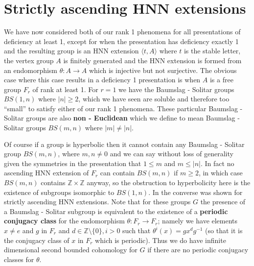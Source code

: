 \documentclass[11pt,reqno]{amsart}
\numberwithin{equation}{section}
\newcommand{\Z}{\mathbb{Z}}
\newcommand{\leqs}{\leqslant}
\newcommand{\geqs}{\geqslant}
\theoremstyle{definition}
\theoremstyle{remark}
\begin{document}
  

\section{Strictly ascending HNN extensions}

We have now considered both of our rank 1 phenomena for all presentations
of deficiency at least 1, except for when the presentation has deficiency
exactly 1 and the resulting group is an HNN extension $\langle t,A\rangle$
where $t$ is the stable letter, the vertex group $A$ is finitely
generated and the HNN extension is formed from an endomorphism
$\theta:A \rightarrow A$ which is injective but not surjective. The obvious
case where this case results in a deficiency 1 presentation is
when $A$ is a free group $F_r$ of rank at least 1. For $r=1$ we have
the Baumslag - Solitar groups $BS(1,n)$
where $|n|\geqs 2$, which we have seen are soluble and therefore too ``small''
to satisfy either of our rank 1 phenomena.
These particular
Baumslag - Solitar groups are also {\bf non - Euclidean} which we define
to mean Baumslag - Solitar groups $BS(m,n)$ where $|m|\neq |n|$.

Of course if a group is hyperbolic then it cannot contain any
Baumslag - Solitar
group $BS(m,n)$, where $m,n\neq 0$ and we can say without loss of generality
given the symmetries in the presentation that $1\leqs m$ and $m\leqs |n|$.
In fact no ascending HNN extension of $F_r$ can contain $BS(m,n)$
if $m\geqs 2$, in which case $BS(m,n)$ contains $\Z\times\Z$ anyway, 
so the obstruction to hyperbolicity here is the existence of subgroups
isomorphic to $BS(1,n)$.
In \cite{mut} the converse was shown for strictly ascending HNN extensions.
Note that for these groups $G$ the presence of a
Baumslag - Solitar subgroup is equivalent to the existence of a {\bf periodic
  conjugacy class} for the endomorphism $\theta:F_r\rightarrow F_r$;
namely we have elements $x\neq e$ and $g$ in $F_r$ and
$d\in\Z\setminus\{0\},i>0$ such that $\theta^i(x)=gx^dg^{-1}$
(so that it is the conjugacy class of $x$ in $F_r$ which is periodic).
Thus we do have infinite dimensional second bounded cohomology for $G$ if 
there are no periodic conjugacy classes for $\theta$.
\end{document}
